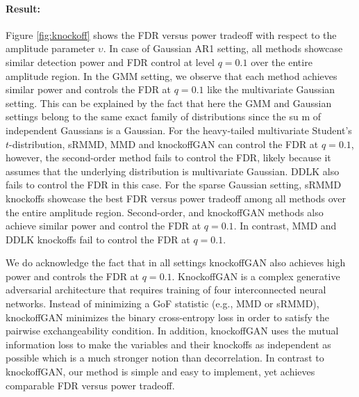 \documentclass{article}
\theoremstyle{definition}
\begin{document}
\paragraph{Result:} Figure \ref{fig:knockoff} shows the FDR versus power tradeoff with respect to the amplitude parameter $\upsilon$. In case of Gaussian AR1 setting, all methods showcase similar detection power and FDR control at level $q=0.1$ over the entire amplitude region. In the GMM setting, we observe that each method achieves similar power and controls the FDR at $q= 0.1$ like the multivariate Gaussian setting. This can be explained by the fact that here the GMM and Gaussian settings belong to the same exact family of distributions since the su    m of independent Gaussians is a Gaussian. For the heavy-tailed multivariate Student's $t$-distribution, sRMMD, MMD and knockoffGAN can control the FDR at $q=0.1$, however, the second-order method fails to control the FDR, likely because it assumes that the underlying distribution is multivariate Gaussian. DDLK also fails to control the FDR in this case. For the sparse Gaussian setting, sRMMD knockoffs showcase the best FDR versus power tradeoff among all methods over the entire amplitude region. Second-order, and knockoffGAN methods also achieve similar power and control the FDR at $q=0.1$. In contrast, MMD and DDLK knockoffs fail to control the FDR at $q= 0.1$.  

We do acknowledge the fact that in all settings knockoffGAN also achieves high power and controls the FDR at $q=0.1$. KnockoffGAN is a complex generative adversarial architecture that requires training of four interconnected neural networks. Instead of minimizing a GoF statistic (e.g., MMD or sRMMD), knockoffGAN minimizes the binary cross-entropy loss in order to satisfy the pairwise exchangeability condition. In addition, knockoffGAN uses the mutual information loss to make the variables and their knockoffs as independent as possible which is a much stronger notion than decorrelation. In contrast to knockoffGAN, our method is simple and easy to implement, yet achieves comparable FDR versus power tradeoff. 
\end{document}
